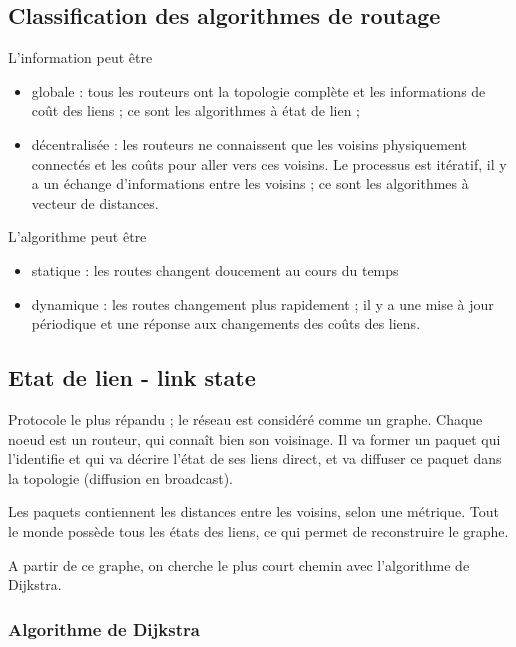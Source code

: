 
	\subsection{Classification des algorithmes de routage}
	
	L'information peut être
	
	\begin{itemize}
		\item globale : tous les routeurs ont la topologie complète et les informations de coût des liens ; ce sont les algorithmes à état de lien ;
		\item décentralisée : les routeurs ne connaissent que les voisins physiquement connectés et les coûts pour aller vers ces voisins. Le processus est itératif, il y a un échange d'informations entre les voisins ; ce sont les algorithmes à vecteur de distances.
	\end{itemize}
	
	L'algorithme peut être
	
	\begin{itemize}
		\item statique : les routes changent doucement au cours du temps
		\item dynamique : les routes changement plus rapidement ; il y a une mise à jour périodique et une réponse aux changements des coûts des liens.
	\end{itemize}


	\subsection{Etat de lien - link state}	
	
	Protocole le plus répandu ; le réseau est considéré comme un graphe. Chaque noeud est un routeur, qui connaît bien son voisinage. Il va former un paquet qui l'identifie et qui va décrire l'état de ses liens direct, et va diffuser ce paquet dans la topologie (diffusion en broadcast).
	
	Les paquets contiennent les distances entre les voisins, selon une métrique. Tout le monde possède tous les états des liens, ce qui permet de reconstruire le graphe.
	
	A partir de ce graphe, on cherche le plus court chemin avec l'algorithme de Dijkstra.
	
		\subsubsection{Algorithme de Dijkstra}
		
